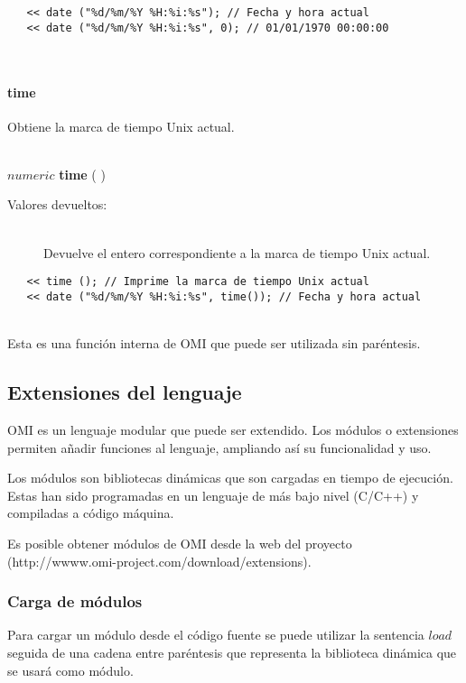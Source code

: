 \begin{lstlisting}  
   << date ("%d/%m/%Y %H:%i:%s"); // Fecha y hora actual
   << date ("%d/%m/%Y %H:%i:%s", 0); // 01/01/1970 00:00:00
\end{lstlisting}
\hfill\\ 

\paragraph{time}
Obtiene la marca de tiempo Unix actual.  

\hfill \\ $numeric$ \textbf{time} ( )  
\begin{description}
\item[Valores devueltos:] \hfill \\
   Devuelve el entero correspondiente a la marca de tiempo Unix actual.
\end{description}

\begin{lstlisting}  
   << time (); // Imprime la marca de tiempo Unix actual
   << date ("%d/%m/%Y %H:%i:%s", time()); // Fecha y hora actual 
\end{lstlisting}
\hfill\\ 

Esta es una función interna de OMI que puede ser utilizada sin paréntesis.

\subsection{Extensiones del lenguaje}
OMI es un lenguaje modular que puede ser extendido. 
Los módulos o extensiones permiten añadir funciones al lenguaje, ampliando así su funcionalidad y uso.

Los módulos son bibliotecas dinámicas que son cargadas en tiempo de ejecución. Estas
han sido programadas en un lenguaje de más bajo nivel (C/C++) y compiladas a código máquina. 

Es posible obtener módulos de OMI desde la web del proyecto 
(http://wwww.omi-project.com/download/extensions). 

\subsubsection{Carga de módulos}
Para cargar un módulo desde el código fuente se puede utilizar la sentencia $load$ seguida de 
una cadena entre paréntesis que representa la biblioteca dinámica que se usará como módulo. \\

